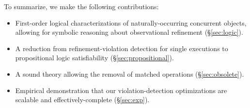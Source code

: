 To summarize, we make the following contributions:
\begin{itemize}

  \item First-order logical characterizations of naturally-occurring concurrent
  objects, allowing for symbolic reasoning about observational refinement
  (\S\ref{sec:logic}).

  \item A reduction from refinement-violation detection for single executions
  to propositional logic satisfiability (\S\ref{sec:propositional}).
  
  \item A sound theory allowing the removal of matched operations
  (\S\ref{sec:obsolete}).
  
  \item Empirical demonstration that our violation-detection optimizations are
  scalable and effectively-complete (\S\ref{sec:exp}).

\end{itemize}
